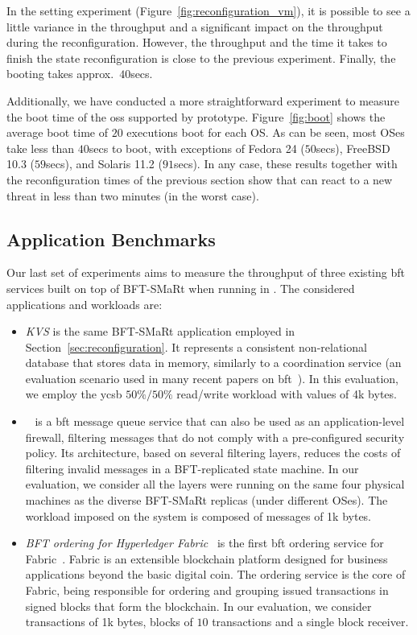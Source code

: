 In the \system setting experiment (Figure~\ref{fig:reconfiguration_vm}),  it is possible to see a little variance in the throughput and a significant impact on the throughput during the reconfiguration. 
However, the throughput and the time it takes to finish the state reconfiguration is close to the previous experiment.
Finally, the booting takes approx.~$40$secs.

Additionally, we have conducted a more straightforward experiment to measure the boot time of the \glspl{os} supported by \system prototype. 
Figure~\ref{fig:boot} shows the average boot time of $20$ executions boot for each OS.
As can be seen, most OSes take less than $40$secs to boot, with exceptions of Fedora 24 ($50$secs), FreeBSD 10.3 ($59$secs), and Solaris 11.2 ($91$secs).
In any case, these results together with the reconfiguration times of the previous section show that \system can react to a new threat in less than two minutes (in the worst case).
\subsection{Application Benchmarks}
Our last set of experiments aims to measure the throughput of three existing \gls{bft} services built on top of BFT-SMaRt when running in \system.
The considered applications and workloads are:

\begin{itemize}

\item \emph{KVS} is the same BFT-SMaRt application employed in Section~\ref{sec:reconfiguration}.
It represents a consistent non-relational database that stores data in memory, similarly to a coordination service (an evaluation scenario used in many recent papers on \gls{bft}~\cite{Liu:2016,Behl:2017}).
In this evaluation, we employ the \gls{ycsb} $50\%/50\%$ read/write workload with values of 4k bytes.

\item \sieveq~\cite{Garcia:2016} is a \gls{bft} message queue service that can also be used as an application-level firewall, filtering messages that do not comply with a pre-configured security policy.
Its architecture, based on several filtering layers, reduces the costs of filtering invalid messages in a BFT-replicated state machine.
In our evaluation, we consider all the layers were running on the same four physical machines as the diverse BFT-SMaRt replicas (under different OSes).
The workload imposed on the system is composed of messages of 1k bytes.

\item \emph{BFT ordering for Hyperledger Fabric}~\cite{Sousa:2018} is the first \gls{bft} ordering service for Fabric~\cite{Androulaki:2018}. 
Fabric is an extensible blockchain platform designed for business applications beyond the basic digital coin.
The ordering service is the core of Fabric, being responsible for ordering and grouping issued transactions in signed blocks that form the blockchain.
In our evaluation, we consider transactions of 1k bytes, blocks of $10$ transactions and a single block receiver.

\end{itemize}

